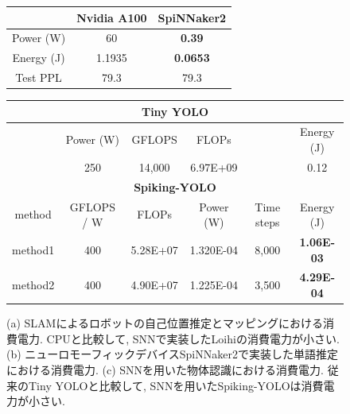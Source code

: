 \begin{figure}[htb]
    \centering

    \begin{minipage}{0.3\textwidth}
        \centering
        
        \label{fig:snnslam}
    \end{minipage}
    \hspace{0.02\textwidth}
    \begin{minipage}{0.6\textwidth}
        \centering
        \begin{tabular}{ccc}
            \hline
            & Nvidia A100 & SpiNNaker2 \\ 
            \hline
            Power (W) & 60 & \textbf{0.39} \\
            Energy (J) & 1.1935 & \textbf{0.0653} \\
            Test PPL & 79.3 & 79.3 \\
            \hline
        \end{tabular}
        \label{tab:spinnaker}
    \end{minipage}


    \begin{minipage}{1.0\textwidth}
        \centering
        \begin{tabular}{cccccc}
            \hline
            \multicolumn{6}{c}{\textbf{Tiny YOLO}}\\
            \hline
            &Power (W) & GFLOPS & FLOPs & & Energy (J) \\
            &250 & 14,000 & 6.97E+09 & & 0.12 \\
            \hline
            \multicolumn{6}{c}{\textbf{Spiking-YOLO}}\\
            \hline
            method & GFLOPS / W & FLOPs & Power (W) & Time steps & Energy (J) \\
            method1 & 400 & 5.28E+07 & 1.320E-04 & 8,000 & \textbf{1.06E-03} \\
            method2 & 400 & 4.90E+07 & 1.225E-04 & 3,500 & \textbf{4.29E-04} \\
            \hline
        \end{tabular}
        \label{tab:snnyolo}
    \end{minipage}

    \caption[SNNの低消費電力性能]{
        (a) SLAMによるロボットの自己位置推定とマッピングにおける消費電力. 
        CPUと比較して, SNNで実装したLoihiの消費電力が小さい.
        (b) ニューロモーフィックデバイスSpiNNaker2で実装した単語推定における消費電力. 
        (c) SNNを用いた物体認識における消費電力. 従来のTiny YOLOと比較して, SNNを用いたSpiking-YOLOは消費電力が小さい.
    }
\end{figure}


